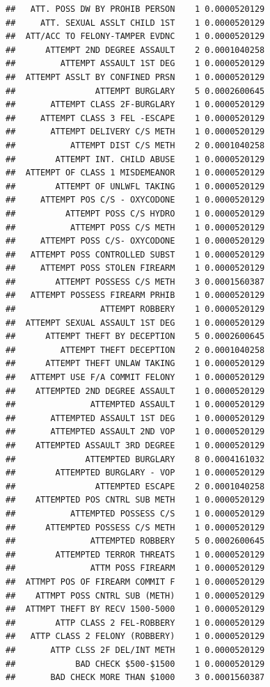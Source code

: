 \documentclass[]{book}
\begin{document}
\begin{verbatim}
##   ATT. POSS DW BY PROHIB PERSON    1 0.0000520129
##     ATT. SEXUAL ASSLT CHILD 1ST    1 0.0000520129
##  ATT/ACC TO FELONY-TAMPER EVDNC    1 0.0000520129
##      ATTEMPT 2ND DEGREE ASSAULT    2 0.0001040258
##         ATTEMPT ASSAULT 1ST DEG    1 0.0000520129
##  ATTEMPT ASSLT BY CONFINED PRSN    1 0.0000520129
##                ATTEMPT BURGLARY    5 0.0002600645
##       ATTEMPT CLASS 2F-BURGLARY    1 0.0000520129
##     ATTEMPT CLASS 3 FEL -ESCAPE    1 0.0000520129
##       ATTEMPT DELIVERY C/S METH    1 0.0000520129
##           ATTEMPT DIST C/S METH    2 0.0001040258
##        ATTEMPT INT. CHILD ABUSE    1 0.0000520129
##  ATTEMPT OF CLASS 1 MISDEMEANOR    1 0.0000520129
##        ATTEMPT OF UNLWFL TAKING    1 0.0000520129
##     ATTEMPT POS C/S - OXYCODONE    1 0.0000520129
##          ATTEMPT POSS C/S HYDRO    1 0.0000520129
##           ATTEMPT POSS C/S METH    1 0.0000520129
##     ATTEMPT POSS C/S- OXYCODONE    1 0.0000520129
##   ATTEMPT POSS CONTROLLED SUBST    1 0.0000520129
##     ATTEMPT POSS STOLEN FIREARM    1 0.0000520129
##        ATTEMPT POSSESS C/S METH    3 0.0001560387
##   ATTEMPT POSSESS FIREARM PRHIB    1 0.0000520129
##                 ATTEMPT ROBBERY    1 0.0000520129
##  ATTEMPT SEXUAL ASSAULT 1ST DEG    1 0.0000520129
##      ATTEMPT THEFT BY DECEPTION    5 0.0002600645
##         ATTEMPT THEFT DECEPTION    2 0.0001040258
##      ATTEMPT THEFT UNLAW TAKING    1 0.0000520129
##   ATTEMPT USE F/A COMMIT FELONY    1 0.0000520129
##    ATTEMPTED 2ND DEGREE ASSAULT    1 0.0000520129
##               ATTEMPTED ASSAULT    1 0.0000520129
##       ATTEMPTED ASSAULT 1ST DEG    1 0.0000520129
##       ATTEMPTED ASSAULT 2ND VOP    1 0.0000520129
##    ATTEMPTED ASSAULT 3RD DEGREE    1 0.0000520129
##              ATTEMPTED BURGLARY    8 0.0004161032
##        ATTEMPTED BURGLARY - VOP    1 0.0000520129
##                ATTEMPTED ESCAPE    2 0.0001040258
##    ATTEMPTED POS CNTRL SUB METH    1 0.0000520129
##           ATTEMPTED POSSESS C/S    1 0.0000520129
##      ATTEMPTED POSSESS C/S METH    1 0.0000520129
##               ATTEMPTED ROBBERY    5 0.0002600645
##        ATTEMPTED TERROR THREATS    1 0.0000520129
##               ATTM POSS FIREARM    1 0.0000520129
##  ATTMPT POS OF FIREARM COMMIT F    1 0.0000520129
##    ATTMPT POSS CNTRL SUB (METH)    1 0.0000520129
##  ATTMPT THEFT BY RECV 1500-5000    1 0.0000520129
##        ATTP CLASS 2 FEL-ROBBERY    1 0.0000520129
##   ATTP CLASS 2 FELONY (ROBBERY)    1 0.0000520129
##       ATTP CLSS 2F DEL/INT METH    1 0.0000520129
##            BAD CHECK $500-$1500    1 0.0000520129
##       BAD CHECK MORE THAN $1000    3 0.0001560387

\end{verbatim}
\end{document}
